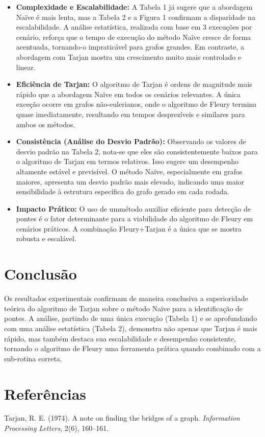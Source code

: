 \documentclass[12pt]{article}
\begin{document}
\begin{itemize}
    \item \textbf{Complexidade e Escalabilidade:} A Tabela 1 já sugere que a abordagem Naïve é mais lenta, mas a Tabela 2 e a Figura 1 confirmam a disparidade na escalabilidade. A análise estatística, realizada com base em 3 execuções por cenário, reforça que o tempo de execução do método Naïve cresce de forma acentuada, tornando-o impraticável para grafos grandes. Em contraste, a abordagem com Tarjan mostra um crescimento muito mais controlado e linear.

    \item \textbf{Eficiência de Tarjan:} O algoritmo de Tarjan é ordens de magnitude mais rápido que a abordagem Naïve em todos os cenários relevantes. A única exceção ocorre em grafos não-eulerianos, onde o algoritmo de Fleury termina quase imediatamente, resultando em tempos desprezíveis e similares para ambos os métodos.
    
    \item \textbf{Consistência (Análise do Desvio Padrão):} Observando os valores de desvio padrão na Tabela 2, nota-se que eles são consistentemente baixos para o algoritmo de Tarjan em termos relativos. Isso sugere um desempenho altamente estável e previsível. O método Naïve, especialmente em grafos maiores, apresenta um desvio padrão mais elevado, indicando uma maior sensibilidade à estrutura específica do grafo gerado em cada rodada.
    
    \item \textbf{Impacto Prático:} O uso de ummétodo auxiliar eficiente para detecção de pontes é o fator determinante para a viabilidade do algoritmo de Fleury em cenários práticos. A combinação Fleury+Tarjan é a única que se mostra robusta e escalável.
\end{itemize}

\section{Conclusão}
Os resultados experimentais confirmam de maneira conclusiva a superioridade teórica do algoritmo de Tarjan sobre o método Naïve para a identificação de pontes. A análise, partindo de uma única execução (Tabela 1) e se aprofundando com uma análise estatística (Tabela 2), demonstra não apenas que Tarjan é mais rápido, mas também destaca sua escalabilidade e desempenho consistente, tornando o algoritmo de Fleury uma ferramenta prática quando combinado com a sub-rotina correta.

\section*{Referências}
\begin{thebibliography}{9}
 Tarjan, R. E. (1974). A note on finding the bridges of a graph. \textit{Information Processing Letters}, 2(6), 160--161.
\end{thebibliography}
\end{document}
